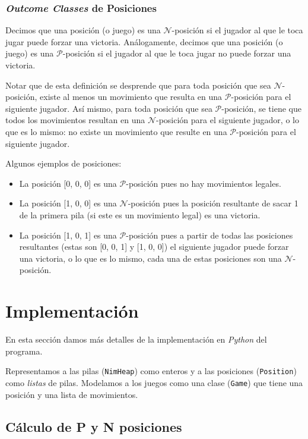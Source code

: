 \documentclass{article}
\newcommand{\calP}{$\mathcal{P}$}
\newcommand{\pPosition}{\calP{}-posición}
\newcommand{\calN}{$\mathcal{N}$}
\newcommand{\nPosition}{\calN{}-posición}
\newcommand{\nimRepresentation}[3]{\trio{#1}{#2}{#3}}
\newcommand{\trio}[3]{[#1, #2, #3]}
\begin{document}
\subsubsection*{\textit{Outcome Classes} de Posiciones}

Decimos que una posición (o juego) es una \nPosition{} si el jugador al que le toca jugar puede forzar una victoria. Análogamente, decimos que una posición (o juego) es una \pPosition{} si el jugador al que le toca jugar no puede forzar una victoria.

Notar que de esta definición se desprende que para toda posición que sea \nPosition{}, existe al menos un movimiento que resulta en una \pPosition{} para el siguiente jugador. Así mismo, para toda posición que sea \pPosition{}, se tiene que todos los movimientos resultan en una \nPosition{} para el siguiente jugador, o lo que es lo mismo: no existe un movimiento que resulte en una \pPosition{} para el siguiente jugador.

Algunos ejemplos de posiciones:

\begin{itemize}
    \item La posición \nimRepresentation{0}{0}{0} es una \pPosition{} pues no hay movimientos legales.
    \item La posición \nimRepresentation{1}{0}{0} es una \nPosition{} pues la posición resultante de sacar 1 de la primera pila (si este es un movimiento legal) es una victoria.
    \item La posición \nimRepresentation{1}{0}{1} es una \pPosition{} pues a partir de todas las posiciones resultantes (estas son \nimRepresentation{0}{0}{1} y \nimRepresentation{1}{0}{0}) el siguiente jugador puede forzar una victoria, o lo que es lo mismo, cada una de estas posiciones son una \nPosition{}.
\end{itemize}

\section*{Implementación}

En esta sección damos más detalles de la implementación en \textit{Python} del programa.

Representamos a las pilas (\texttt{NimHeap}) como enteros y a las posiciones (\texttt{Position}) como \textit{listas} de pilas. Modelamos a los juegos como una clase (\texttt{Game}) que tiene una posición y una lista de movimientos.

\subsection*{Cálculo de P y N posiciones}
\end{document}
